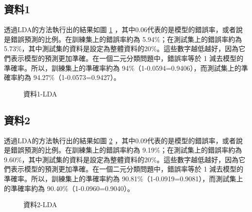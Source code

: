 \subsection{資料1}
透過LDA的方法執行出的結果如圖 \ref{fig:la1-LDA} ，其中0.06代表的是模型的錯誤率，或者說是錯誤預測的比例。在訓練集上的錯誤率約為 5.94\%；在測試集上的錯誤率約為 5.73\%，其中測試集的資料是設定為整體資料的20\%。這些數字越低越好，因為它們表示模型的預測更加準確。在一個二元分類問題中，錯誤率等於 1 減去模型的準確率。所以，訓練集上的準確率約為 94\%（1-0.0594=0.9406），而測試集上的準確率約為 94.27\%（1-0.0573=0.9427）。\\
\begin{table} [H]
\centering
    \caption{資料1之LDA錯判率}\label{tb:la1-LDA}
    \renewcommand\arraystretch{1.5}
\end{table}

\begin{figure}[h]
    \caption{資料1-LDA}
    \label{fig:la1-LDA}
\end{figure}

\subsection{資料2}
透過LDA的方法執行出的結果如圖 \ref{fig:la2-LDA} ，其中0.09代表的是模型的錯誤率，或者說是錯誤預測的比例。在訓練集上的錯誤率約為 9.19\%；在測試集上的錯誤率約為 9.60\%，其中測試集的資料是設定為整體資料的20\%。這些數字越低越好，因為它們表示模型的預測更加準確。在一個二元分類問題中，錯誤率等於 1 減去模型的準確率。所以，訓練集上的準確率約為 90.81\%（1-0.0919=0.9081），而測試集上的準確率約為 90.40\%（1-0.0960=0.9040）。\\
\begin{table} [h]
\centering
    \caption{資料2之LDA錯判率}\label{tb:la2-LDA}
    \renewcommand\arraystretch{1.5}
\end{table}
\begin{figure}[h]
    \caption{資料2-LDA}
    \label{fig:la2-LDA}
\end{figure}

